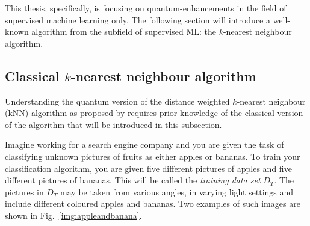 This thesis, specifically, is focusing on quantum-enhancements in the field of supervised machine learning only. The following section will introduce a well-known algorithm from the subfield of supervised ML: the $k$-nearest neighbour algorithm.

\subsection{Classical $k$-nearest neighbour algorithm}
\label{subsubsec:knearestneighbour}

Understanding the quantum version of the distance weighted $k$-nearest neighbour (kNN) algorithm as proposed by  requires prior knowledge of the classical version of the algorithm that will be introduced in this subsection.

Imagine working for a search engine company and you are given the task of classifying unknown pictures of fruits as either apples or bananas. To train your classification algorithm, you are given five different pictures of apples and five different pictures of bananas. This will be called the \emph{training data set} ${D}_{T}$. The pictures in ${D}_{T}$ may be taken from various angles, in varying light settings and include different coloured apples and bananas. Two examples of such images are shown in Fig.~\ref{img:appleandbanana}. 

